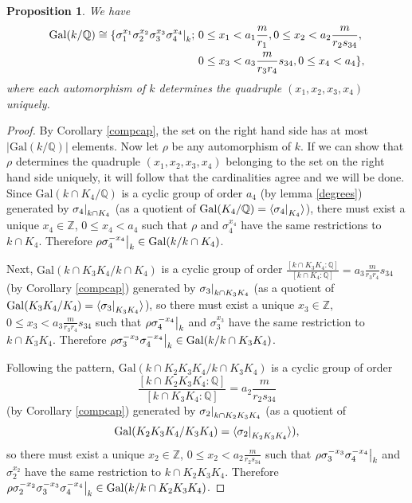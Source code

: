 \documentclass[12pt,a4paper]{article}
\newtheorem{prop}[theorem]{Proposition}
\newcommand{\Qbb}{\mathbb{Q}}
\newcommand{\Q}{\mathbb{Q}}
\newcommand{\Z}{\mathbb{Z}}
\newcommand{\Gal}{\mathrm{Gal}}
\newcommand\restr[2]{{%
  \left.\kern-\nulldelimiterspace %
  #1 %
  \right|_{#2} %
  }}
\begin{document}
\begin{prop}\label{gal}
We have 
\begin{equation*}
\begin{split}
\Gal(k/\Qbb)\cong
 \{\restr{\sigma_1^{x_1}\sigma_2^{x_2}\sigma_3^{x_3}\sigma_4^{x_4}}{k};~ & 0\leq x_1<a_1\frac{m}{r_1}, 0\leq x_2<a_2\frac{m}{r_2s_{34}}, \\ & 0\leq x_3<a_3\frac{m}{r_3r_4}s_{34},0\leq x_4<a_4\},
\end{split}
\end{equation*}
where each automorphism of $k$ determines the quadruple $(x_1,x_2,x_3,x_4)$ uniquely.
\end{prop}
\begin{proof}
By Corollary \ref{compcap}, the set on the right hand side has at most $|\Gal(k/\Qbb)|$ elements. Now let $\rho$ be any automorphism of $k$. If we can show that $\rho$ determines the quadruple $(x_1,x_2,x_3,x_4)$ belonging to the set on the right hand side uniquely, it will follow that the cardinalities agree and we will be done. Since $\Gal(k\cap K_4/\Q)$ is a cyclic group of order $a_4$ (by lemma \ref{degrees}) generated by $\restr{\sigma_4}{k\cap K_4}$ (as a quotient of $\Gal(K_4/\Q)=\langle \restr{\sigma_4}{K_4}\rangle$), there must exist a unique $x_4\in \Z$, $0\leq x_4<a_4$ such that $\rho$ and $\sigma_4^{x_4}$ have the same restrictions to $k\cap K_4$. Therefore $\rho\restr{\sigma_4^{-x_4}}{k}\in \Gal(k/k\cap K_4)$. 

Next, $\Gal(k\cap K_3K_4/k\cap K_4)$ is a cyclic group of order $\frac{[k\cap K_3K_4:\Q]}{[k\cap K_4:\Q]}=a_3\frac{m}{r_3r_4}s_{34}$ (by Corollary \ref{compcap}) generated by $\restr{\sigma_3}{k\cap K_3K_4}$ (as a quotient of $\Gal(K_3K_4/K_4)=\langle \restr{\sigma_3}{K_3K_4}\rangle$), so there must exist a unique $x_3\in \Z$, $0\leq x_3<a_3\frac{m}{r_3r_4}s_{34}$ such that $\rho \restr{\sigma_4^{-x_4}}{k}$ and $\sigma_3^{x_3}$ have the same restriction to $k\cap K_3K_4$. Therefore $\restr{\rho\sigma_3^{-x_3}\sigma_4^{-x_4}}{k}\in \Gal(k/k\cap K_3K_4)$.

Following the pattern, $\Gal(k\cap K_2K_3K_4/k\cap K_3K_4)$ is a cyclic group of order 
$$\frac{[k\cap K_2K_3K_4:\Q]}{[k\cap K_3K_4:\Q]}=a_2\frac{m}{r_2s_{34}}$$ (by Corollary \ref{compcap}) generated by $\restr{\sigma_2}{k\cap K_2K_3K_4}$ (as a quotient of $$\Gal(K_2K_3K_4/K_3K_4)=\langle \restr{\sigma_2}{K_2K_3K_4}\rangle),$$ so there must exist a unique $x_2\in \Z$, $0\leq x_2<a_2\frac{m}{r_2s_{34}}$ such that $\rho\restr{\sigma_3^{-x_3}\sigma_4^{-x_4}}{k}$ and $\sigma_2^{x_2}$ have the same restriction to $k\cap K_2K_3K_4$. Therefore $\restr{\rho\sigma_2^{-x_2}\sigma_3^{-x_3}\sigma_4^{-x_4}}{k}\in \Gal(k/k\cap K_2K_3K_4)$.


\end{proof}
\end{document}
